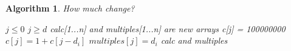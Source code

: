 \documentclass[11pt]{article}
\newtheorem{algorithm}{Algorithm}
\begin{document}
\begin{enumerate}
\begin{enumerate}
\begin{enumerate}
            
        \end{enumerate}
    
        
    \end{enumerate}
    
    \begin{algorithm}
    \caption{How much change?}\label{alg:cap}
    \begin{algorithmic}
        \Require $j \leq 0$
        \Ensure $j \geq d$
        \State calc[1...n] and multiples[1...n] are new arrays
            \State c[j] = 100000000 
                    \State $c[j] = 1 + c[j-d_i]$
                    \State $multiples[j] = d_i$  
                \EndIf
            \ENDFOR
        \ENDFOR
        \State \Return calc and multiples
    \end{algorithmic}
    \end{algorithm}
    
\pagebreak


\pagebreak 

\pagebreak


\end{enumerate}
\end{document}
